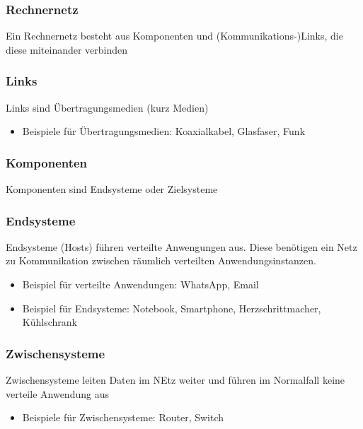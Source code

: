     \subsubsection{Rechnernetz}
      Ein Rechnernetz besteht aus Komponenten und (Kommunikations-)Links, die diese miteinander
      verbinden
    \subsubsection{Links}
      Links sind Übertragungsmedien (kurz Medien)
      \begin{itemize}
        \item Beispiele für Übertragungsmedien: Koaxialkabel, Glasfaser, Funk
      \end{itemize}
    \subsubsection{Komponenten}
      Komponenten sind Endsysteme oder Zielsysteme
    \subsubsection{Endsysteme}
      Endsysteme (Hosts) führen verteilte Anwengungen aus. Diese benötigen ein Netz zu Kommunikation
      zwischen räumlich verteilten Anwendungsinstanzen.
      \begin{itemize}
        \item Beispiel für verteilte Anwendungen: WhatsApp, Email
        \item Beispiel für Endsysteme: Notebook, Smartphone, Herzschrittmacher, Kühlschrank
      \end{itemize}
    \subsubsection{Zwischensysteme}
      Zwischensysteme leiten Daten im NEtz weiter und führen im Normalfall keine verteile Anwendung aus
      \begin{itemize}
        \item Beispiele für Zwischensysteme: Router, Switch
      \end{itemize}

